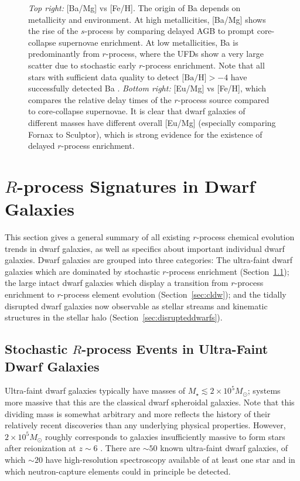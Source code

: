 \documentclass[letterpaper]{article}
\begin{document}
\begin{figure}
{    \emph{Top right:} [Ba/Mg] vs [Fe/H]. The origin of Ba depends on metallicity and environment. At high metallicities, [Ba/Mg] shows the rise of the $s$-process by comparing delayed AGB to prompt core-collapse supernovae enrichment. At low metallicities, Ba is predominantly from $r$-process, where the UFDs show a very large scatter due to stochastic early $r$-process enrichment.
    Note that all stars with sufficient data quality to detect $\mbox{[Ba/H]} > -4$ have successfully detected Ba \citep{Roederer13}.
    \emph{Bottom right:} [Eu/Mg] vs [Fe/H], which compares the relative delay times of the $r$-process source compared to core-collapse supernovae.
    It is clear that dwarf galaxies of different masses have different overall [Eu/Mg] (especially comparing Fornax to Sculptor), which is strong evidence for the existence of delayed $r$-process enrichment.
    }
    \label{fig:chemevol}
\end{figure}



\section{$R$-process Signatures in Dwarf Galaxies}\label{sec:dwarfrproc}

This section gives a general summary of all existing $r$-process chemical evolution trends in dwarf galaxies, as well as specifics about  important individual dwarf galaxies.
Dwarf galaxies are grouped into three categories: The ultra-faint dwarf galaxies which are dominated by stochastic $r$-process enrichment (Section~\ref{sec:ufd}); the large intact dwarf galaxies which display a transition from $r$-process enrichment to $r$-process element evolution (Section~\ref{sec:cldw}); and the tidally disrupted dwarf galaxies now observable as stellar streams and kinematic structures in the stellar halo (Section~\ref{sec:disrupteddwarfs}).

\subsection{Stochastic $R$-process Events in Ultra-Faint Dwarf Galaxies}\label{sec:ufd}

Ultra-faint dwarf galaxies typically have masses of $M_\star \lesssim 2 \times 10^5 M_\odot$; systems more massive that this are the classical dwarf spheroidal galaxies. Note that this dividing mass is somewhat arbitrary and more reflects the history of their relatively recent discoveries than any underlying physical properties. However, $2 \times 10^5 M_\odot$ roughly corresponds to galaxies insufficiently massive to form stars after reionization at $z \sim 6$ \citep{Simon2019}.
There are ${\sim}50$ known ultra-faint dwarf galaxies, of which ${\sim}20$ have high-resolution spectroscopy available of at least one star and in which neutron-capture elements could in principle be detected.
\end{document}

